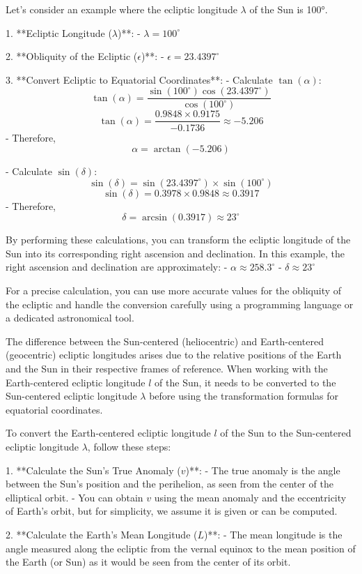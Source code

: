 \documentclass[12pt,a4paper]{article}
\begin{document}
	Let’s consider an example where the ecliptic longitude \(\lambda\) of the Sun is 100°.
	
	1. **Ecliptic Longitude (\(\lambda\))**:
	- \(\lambda = 100^\circ\)
	
	2. **Obliquity of the Ecliptic (\(\epsilon\))**:
	- \(\epsilon = 23.4397^\circ\)
	
	3. **Convert Ecliptic to Equatorial Coordinates**:
	- Calculate \(\tan(\alpha)\):
	\[
	\tan(\alpha) = \frac{\sin(100^\circ) \cos(23.4397^\circ)}{\cos(100^\circ)}
	\]
	\[
	\tan(\alpha) = \frac{0.9848 \times 0.9175}{-0.1736} \approx -5.206
	\]
	- Therefore,
	\[
	\alpha = \arctan(-5.206)
	\]
	
	- Calculate \(\sin(\delta)\):
	\[
	\sin(\delta) = \sin(23.4397^\circ) \times \sin(100^\circ)
	\]
	\[
	\sin(\delta) = 0.3978 \times 0.9848 \approx 0.3917
	\]
	- Therefore,
	\[
	\delta = \arcsin(0.3917) \approx 23^\circ
	\]
	
	By performing these calculations, you can transform the ecliptic longitude of the Sun into its corresponding right ascension and declination. In this example, the right ascension and declination are approximately:
	- \(\alpha \approx 258.3^\circ\)
	- \(\delta \approx 23^\circ\)
	
	For a precise calculation, you can use more accurate values for the obliquity of the ecliptic and handle the conversion carefully using a programming language or a dedicated astronomical tool.
	
	The difference between the Sun-centered (heliocentric) and Earth-centered (geocentric) ecliptic longitudes arises due to the relative positions of the Earth and the Sun in their respective frames of reference. When working with the Earth-centered ecliptic longitude \(l\) of the Sun, it needs to be converted to the Sun-centered ecliptic longitude \(\lambda\) before using the transformation formulas for equatorial coordinates.
	
	To convert the Earth-centered ecliptic longitude \(l\) of the Sun to the Sun-centered ecliptic longitude \(\lambda\), follow these steps:
	
	1. **Calculate the Sun's True Anomaly (\(v\))**:
	- The true anomaly is the angle between the Sun's position and the perihelion, as seen from the center of the elliptical orbit.
	- You can obtain \(v\) using the mean anomaly and the eccentricity of Earth's orbit, but for simplicity, we assume it is given or can be computed.
	
	2. **Calculate the Earth's Mean Longitude (\(L\))**:
	- The mean longitude is the angle measured along the ecliptic from the vernal equinox to the mean position of the Earth (or Sun) as it would be seen from the center of its orbit.
	
\end{document}
